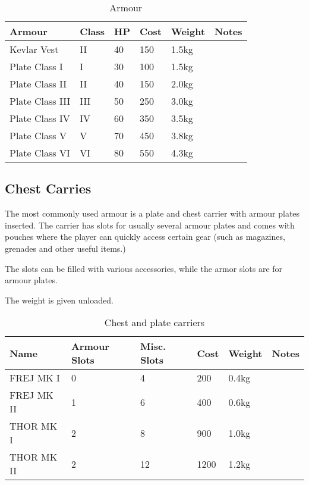 \begin{table}
  \caption{Armour}
  \label{tab:Armour}
  \begin{center}
    \begin{tabular}{| l | l | l | l | l | l |}

      \hline
      \textbf{Armour} & \textbf{Class} & \textbf{HP} &
      \textbf{Cost} & \textbf{Weight} & \textbf{Notes} \\ \hline

      Kevlar Vest     &  II & 40 & 150 & 1.5kg & \\ \hline
      Plate Class I   &   I & 30 & 100 & 1.5kg & \\ \hline
      Plate Class II  &  II & 40 & 150 & 2.0kg & \\ \hline
      Plate Class III & III & 50 & 250 & 3.0kg & \\ \hline
      Plate Class IV  &  IV & 60 & 350 & 3.5kg & \\ \hline
      Plate Class V   &   V & 70 & 450 & 3.8kg & \\ \hline
      Plate Class VI  &  VI & 80 & 550 & 4.3kg & \\ \hline

    \end{tabular}
  \end{center}
\end{table}

\subsection{Chest Carries}

The most commonly used armour is a plate and chest carrier with armour plates
inserted. The carrier has slots for usually several armour plates and comes
with pouches where the player can quickly access certain gear (such as
magazines, grenades and other useful items.)

The slots can be filled with various accessories, while the armor slots are
for armour plates.

The weight is given unloaded.

\begin{table}
  \caption{Chest and plate carriers}
  \label{tab:Carriers}
  \begin{center}
    \begin{tabular}{| l | l | l | l | l | l |}

      \hline
      \textbf{Name} & \textbf{Armour Slots} & \textbf{Misc. Slots} &
      \textbf{Cost} & \textbf{Weight} & \textbf{Notes} \\ \hline

      FREJ MK I   & 0 &  4 &  200 & 0.4kg & \\ \hline
      FREJ MK II  & 1 &  6 &  400 & 0.6kg & \\ \hline

      THOR MK I   & 2 &  8 &  900 & 1.0kg & \\ \hline
      THOR MK II  & 2 & 12 & 1200 & 1.2kg & \\ \hline

    \end{tabular}
  \end{center}
\end{table}

